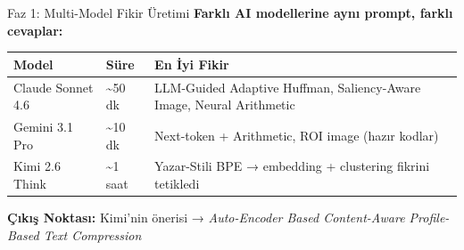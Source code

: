 \documentclass[10pt,aspectratio=43]{beamer}
\begin{document}
\begin{frame}{Faz 1: Multi-Model Fikir Üretimi}
  \textbf{Farklı AI modellerine aynı prompt, farklı cevaplar:}
  \vspace{0.3em}

  \begin{table}
    \small
    \begin{tabular}{llp{5.5cm}}
      \toprule
      \textbf{Model} & \textbf{Süre} & \textbf{En İyi Fikir} \\
      \midrule
      Claude Sonnet 4.6 & \textasciitilde50 dk & LLM-Guided Adaptive Huffman, Saliency-Aware Image, Neural Arithmetic \\
      \rowcolor{teal!10} Gemini 3.1 Pro & \textasciitilde10 dk & Next-token + Arithmetic, ROI image (hazır kodlar) \\
      \rowcolor{teal!10} Kimi 2.6 Think & \textasciitilde1 saat & \alert{Yazar-Stili BPE} → embedding + clustering fikrini tetikledi \\
      \bottomrule
    \end{tabular}
  \end{table}

  \vspace{0.3em}
  \begin{center}
    \textbf{Çıkış Noktası:} Kimi'nin önerisi → \textit{Auto-Encoder Based Content-Aware Profile-Based Text Compression}
  \end{center}
\end{frame}
\end{document}
